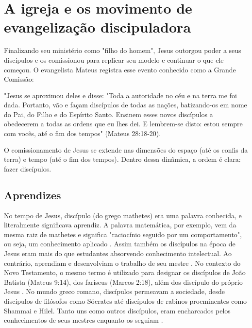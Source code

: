 \documentclass[12pt,openright,oneside,a4paper,
english,french,spanish,brazil]{abntex2}
\begin{document}
\section{A igreja e os movimento de evangelização discipuladora}

Finalizando seu ministério como "filho do homem", Jesus outorgou poder a seus discípulos e os comissionou para replicar seu modelo e continuar o que ele começou. O evangelista Mateus registra esse evento conhecido como a Grande Comissão: 

\begin{citacao}
"Jesus se aproximou deles e disse: "Toda a autoridade no céu e na terra me foi dada. Portanto, vão e façam discípulos de todas as nações, batizando-os em nome do Pai, do Filho e do Espírito Santo. Ensinem esses novos discípulos a obedecerem a todas as ordens que eu lhes dei. E lembrem-se disto: estou sempre com vocês, até o fim dos tempos" (Mateus 28:18-20).
\end{citacao}

O comissionamento de Jesus se extende nas dimensões do espaço (até os confis da terra) e tempo (até o fim dos tempos). Dentro dessa dinâmica, a ordem é clara: fazer discípulos.  

\subsection{Aprendizes} 

No tempo de Jesus, discípulo (do grego mathetes) era uma palavra conhecida, e literalmente significava aprendiz. A palavra matemática, por exemplo, vem da mesma raiz de mathetes e significa "raciocínio seguido por um comportamento", ou seja, um conhecimento aplicado \cite[p. 15]{gtsm}. Assim também os discípulos na época de Jesus eram mais do que estudantes absorvendo conhecimento intelectual. Ao contrário, aprendiam e desenvolviam o trabalho de seu mestre \cite[p. 15]{gtsm}. No contexto do Novo Testamento, o mesmo termo é utilizado para designar os discípulos de João Batista (Mateus 9:14), dos fariseus (Marcos 2:18), além dos discípulo do próprio Jesus \cite[p. 59]{brandao}. No mundo greco romano, discípulos permeavam a sociedade, desde discípulos de filósofos como Sócrates até discípulos de rabinos proeminentes como Shammai e Hilel. Tanto uns como outros discípulos, eram encharcados pelos conhecimentos de seus mestres enquanto os seguiam \cite[p. 209]{shirley}.
\end{document}
